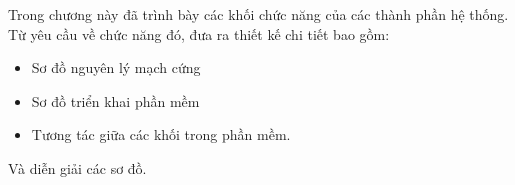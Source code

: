 Trong chương này đã trình bày các khối chức năng của các thành phần hệ thống. Từ yêu cầu về chức năng đó, đưa ra thiết kế chi tiết bao gồm:

\begin{itemize}
    \item Sơ đồ nguyên lý mạch cứng 
    \item Sơ đồ triển khai phần mềm
    \item Tương tác giữa các khối trong phần mềm.
\end{itemize}

Và diễn giải các sơ đồ.


















